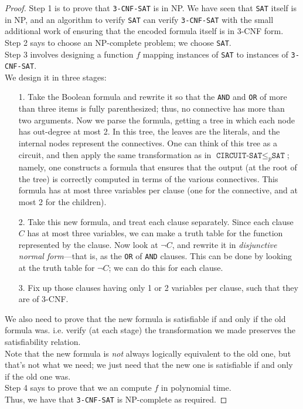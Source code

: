 \documentclass[12pt]{article}
\theoremstyle{plain}
\theoremstyle{definition}
\begin{document}
\begin{proof}
Step 1 is to prove that \texttt{3-CNF-SAT} is in NP.
We have seen that \texttt{SAT} itself is in NP, and an algorithm to verify \texttt{SAT} can verify \texttt{3-CNF-SAT} with the small additional work of ensuring that the encoded formula itself is in 3-CNF form. \\

Step 2 says to choose an NP-complete problem;
we choose \texttt{SAT}. \\

Step 3 involves designing a function $f$ mapping instances of \texttt{SAT} to instances of \texttt{3-CNF-SAT}. \\
We design it in three stages:
\begin{enumerate}
  \item[1.] Take the Boolean formula and rewrite it so that the \texttt{AND} and \texttt{OR} of more than three items is fully parenthesized;
  thus, no connective has more than two arguments.
  Now we parse the formula, getting a tree in which each node has out-degree at most 2.
  In this tree, the leaves are the literals, and the internal nodes represent the connectives.
  One can think of this tree as a circuit, and then apply the same transformation as in $\texttt{CIRCUIT-SAT} \leq_{p} \texttt{SAT}$;
  namely, one constructs a formula that ensures that the output (at the root of the tree) is correctly computed in terms of the various connectives.
  This formula has at most three variables per clause (one for the connective, and at most 2 for the children). \medskip

  \item[2.] Take this new formula, and treat each clause separately.
  Since each clause $C$ has at most three variables, we can make a truth table for the function represented by the clause.
  Now look at $\neg C$, and rewrite it in \emph{disjunctive normal form}---that is, as the \texttt{OR} of \texttt{AND} clauses.
  This can be done by looking at the truth table for $\neg C$;
  we can do this for each clause. \medskip

  \item[3.] Fix up those clauses having only 1 or 2 variables per clause, such that they are of 3-CNF.
\end{enumerate}
We also need to prove that the new formula is satisfiable if and only if the old formula was.
i.e. verify (at each stage) the transformation we made preserves the satisfiability relation. \\
Note that the new formula is \emph{not} always logically equivalent to the old one, but that's not what we need;
we just need that the new one is satisfiable if and only if the old one was. \\

Step 4 says to prove that we an compute $f$ in polynomial time. \\

Thus, we have that \texttt{3-CNF-SAT} is NP-complete as required.
\end{proof}
\end{document}
